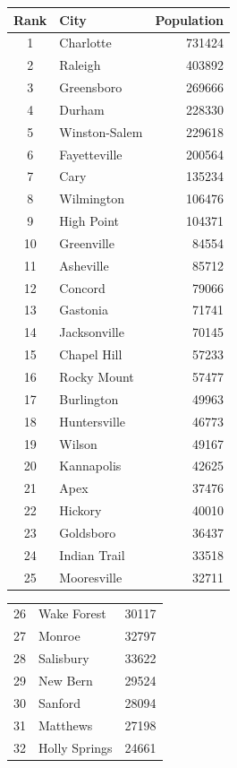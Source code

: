\documentclass[12pt]{article}
\begin{document}
\begin{table}
\small
\centering
\begin{tabular}{clr}
Rank & City & Population \\
\hline
1  &  Charlotte   &  731424 \\
2  &  Raleigh   &  403892 \\
3  &  Greensboro   &  269666 \\
4  &  Durham   &  228330 \\
5  &  Winston-Salem   &  229618 \\
6  &  Fayetteville   &  200564 \\
7  &  Cary  &  135234 \\
8  &  Wilmington   &  106476 \\
9  &  High Point  &  104371 \\
10  &  Greenville   &  84554 \\
11  &  Asheville   &  85712 \\
12  &  Concord   &  79066 \\
13  &  Gastonia   &  71741 \\
14  &  Jacksonville   &  70145 \\
15  &  Chapel Hill  &  57233 \\
16  &  Rocky Mount  &  57477 \\
17  &  Burlington  &  49963 \\
18  &  Huntersville  &  46773 \\
19  &  Wilson   &  49167 \\
20  &  Kannapolis  &  42625 \\
21  &  Apex  &  37476 \\
22  &  Hickory  &  40010 \\
23  &  Goldsboro   &  36437 \\
24  &  Indian Trail  &  33518 \\
25  &  Mooresville  &  32711 \\
\hline
\end{tabular}
\quad
\begin{tabular}{clr}
 & & \\
\hline
26  &  Wake Forest  &  30117 \\
27  &  Monroe   &  32797 \\
28  &  Salisbury   &  33622 \\
29  &  New Bern   &  29524 \\
30  &  Sanford   &  28094 \\
31  &  Matthews  &  27198 \\
32  &  Holly Springs  &  24661 \\

\end{tabular}
\end{table}
\end{document}
